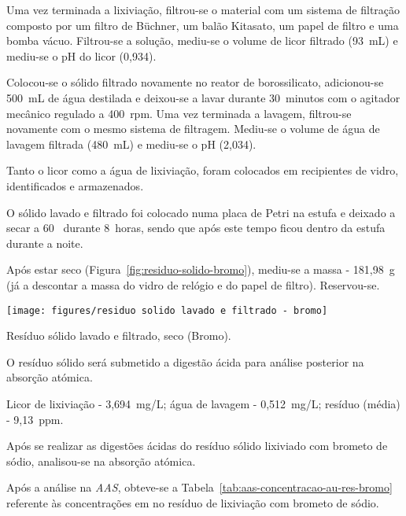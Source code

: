 Uma vez terminada a lixiviação, filtrou-se o material com um sistema de filtração composto por um filtro de Büchner, um balão Kitasato, um papel de filtro e uma bomba vácuo.
Filtrou-se a solução, mediu-se o volume de licor filtrado (93~mL) e mediu-se o pH do licor (0,934).

Colocou-se o sólido filtrado novamente no reator de borossilicato, adicionou-se 500~mL de água destilada e deixou-se a lavar durante 30~minutos com o agitador mecânico regulado a 400~rpm.
Uma vez terminada a lavagem, filtrou-se novamente com o mesmo sistema de filtragem.
Mediu-se o volume de água de lavagem filtrada (480~mL) e mediu-se o pH (2,034).

Tanto o licor como a água de lixiviação, foram colocados em recipientes de vidro, identificados e armazenados.

O sólido lavado e filtrado foi colocado numa placa de Petri na estufa e deixado a secar a 60~\graus{} durante 8~horas, sendo que após este tempo ficou dentro da estufa durante a noite.

Após estar seco (Figura~\ref{fig:residuo-solido-bromo}), mediu-se a massa - 181,98~g (já a descontar a massa do vidro de relógio e do papel de filtro).
Reservou-se.

\begin{marginfigure}[-1cm]
    \centering
    \texttt{[image: figures/residuo solido lavado e filtrado - bromo]}
    \caption{Resíduo sólido lavado e filtrado, seco (Bromo).}
    \label{fig:residuo-solido-bromo}
\end{marginfigure}

O resíduo sólido será submetido a digestão ácida para análise posterior na absorção atómica.

 Licor de lixiviação - 3,694~mg/L; água de lavagem - 0,512~mg/L; resíduo (média) - 9,13~ppm.

\hrulefill


Após se realizar as digestões ácidas do resíduo sólido lixiviado com brometo de sódio, analisou-se na absorção atómica.

Após a análise na \emph{AAS}, obteve-se a Tabela~\ref{tab:aas-concentracao-au-res-bromo} referente às concentrações em  no resíduo de lixiviação com brometo de sódio.

